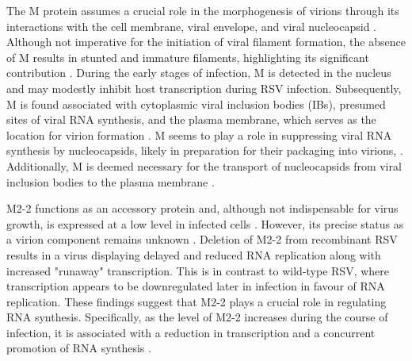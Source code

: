 The M protein assumes a crucial role in the morphogenesis of virions through its interactions with the cell membrane, viral envelope, and viral nucleocapsid \cite{Li2008AssociationProtein, Marty2003AssociationCells}. Although not imperative for the initiation of viral filament formation, the absence of M results in stunted and immature filaments, highlighting its significant contribution \cite{Mitra2012TheFilaments}. During the early stages of infection, M is detected in the nucleus and may modestly inhibit host transcription during RSV infection. Subsequently, M is found associated with cytoplasmic viral inclusion bodies (IBs), presumed sites of viral RNA synthesis, and the plasma membrane, which serves as the location for virion formation \cite{Ghildyal2006CentralInfection}. M seems to play a role in suppressing viral RNA synthesis by nucleocapsids, likely in preparation for their packaging into virions, \cite{Ghildyal2006CentralInfection, NarayanTalukdar2022RespiratoryVirus}. Additionally, M is deemed necessary for the transport of nucleocapsids from viral inclusion bodies to the plasma membrane \cite{Mitra2012TheFilaments, Collins2013RespiratoryDisease}.

M2-2 functions as an accessory protein and, although not indispensable for virus growth, is expressed at a low level in infected cells \cite{Cheng2005OverexpressionReplication, Melero2006MolecularVirus}. However, its precise status as a virion component remains unknown \cite{Collins2013RespiratoryDisease}. Deletion of M2-2 from recombinant RSV results in a virus displaying delayed and reduced RNA replication along with increased "runaway" transcription. This is in contrast to wild-type RSV, where transcription appears to be downregulated later in infection in favour of RNA replication. These findings suggest that M2-2 plays a crucial role in regulating RNA synthesis. Specifically, as the level of M2-2 increases during the course of infection, it is associated with a reduction in transcription and a concurrent promotion of RNA synthesis \cite{Teng1998IdentificationParticles}.

